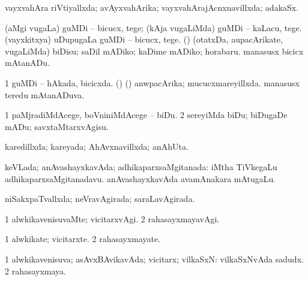 {\bentry
{} 
\gl{\gu}
\expl{}
\bmng
vayxvahAra riVtiyallxda; avAyxvahArika; vayxvahArajAcnxnavillxda; adakaSx. 
\emng
\eentry

\bentry
{} 
\gl{\sakirx}
\expl{}
\bmng
\bnum
{} 
\banum
{} (aMgi \mo vugaLa) guMDi -- bicucx, tege; (kAja \mo vugaLiMda) guMDi -- kaLacu, tege. 
 (vayxkitxya) uDupugaLa guMDi -- bicucx, tege. 
\eanum
\numie
{} (\AmA) 
\banum
{} (otatxDa, aupacArikate, \mo vugaLiMda) biDisu; saDil mADiko; kaDime mADiko; horabaru. 
 manasusx bicicx mAtanADu. 
\eanum
\numie
\enum
\emng
\eentry

\bentry
{} 
\gl{\gu}
\expl{}
\bmng
\bnum
\num{1} guMDi -- hAkada, bicicxda. 
 (\rUpa) (\AmA) 
\banum
{} anwpacArika; mucucxmareyillxda. 
 manasusx teredu mAtanADuva. 
\eanum
\numie
\enum
\emng
\eentry

\bentry
{} 
\gl{\sakirx}
\expl{}
\bmng
\bnum
\num{1} paMjradiMdAcege, boVniniMdAcege -- biDu. 
\num{2} sereyiMda biDu; biDugaDe mADu; savxtaMtarxvAgisu. 
\enum
\emng
\eentry

\bentry
{} 
\gl{\gu}
\bmng
karedillxda; kareyada; AhAvxnavillxda; anAhUta. 
\emng
\eentry

\bentry
{} 
\gl{\gu}
\expl{}
\bmng
keVLada; anAvashayxkavAda; adhikaparxsaMgitanada:  iMtha TiVkegaLu adhikaparxsaMgitanadavu.  anAvashayxkavAda avamAnakara mAtugaLu. 
\emng
\eentry

\bentry
{} 
\gl{\gu}
\expl{}
\bmng
niSakxpaTvallxda; neVravAgirada; saraLavAgirada. 
\emng
\eentry

\bentry
{} 
\gl{\kirxvi}
\expl{}
\bmng
\bnum
\num{1} alwkikavenisuvaMte; vicitarxvAgi. 
\num{2} rahasayxmayavAgi. 
\enum
\emng
\eentry

\bentry
{} 
\gl{\nA}
\expl{}
\bmng
\bnum
\num{1} alwkikate; vicitarxte. 
\num{2} rahasayxmayate. 
\enum
\emng
\eentry

\bentry
{} 
\gl{\gu}
\bmng
\bnum
\num{1} alwkikavenisuva; asAvxBAvikavAda; vicitarx; vilkaSxN:  vilkaSxNvAda sadudx. 
\num{2} rahasayxmaya. 
\enum
\emng
\eentry

}
